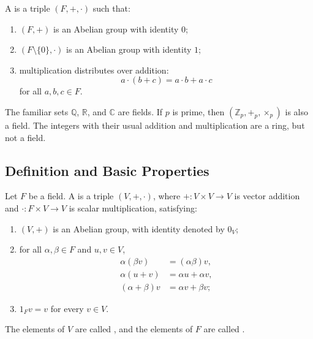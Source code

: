 \begin{Definition}
A  is a triple $(F,+,\cdot)$ such that:
\begin{enumerate}
\item $(F,+)$ is an Abelian group with identity $0$;
\item $(F\setminus\{0\},\cdot)$ is an Abelian group with identity $1$;
\item multiplication distributes over addition:
\begin{equation*}
a\cdot(b+c)=a\cdot b+a\cdot c
\end{equation*}
for all $a,b,c\in F$.
\end{enumerate}
\end{Definition}

The familiar sets $\mathbb Q$, $\mathbb R$, and $\mathbb C$ are fields. If $p$ is prime, then $(\mathbb Z_p,+_p,\times_p)$ is also a field. The integers with their usual addition and multiplication are a ring, but not a field.

\subsection{Definition and Basic Properties}

\begin{Definition}\label{def:VectorSpace}
Let $F$ be a field. A  is a triple $(V,+,\cdot)$, where $+\colon V\times V\to V$ is vector addition and $\cdot\colon F\times V\to V$ is scalar multiplication, satisfying:
\begin{enumerate}
\item $(V,+)$ is an Abelian group, with identity denoted by $0_V$;
\item for all $\alpha,\beta\in F$ and $u,v\in V$,
\begin{align*}
\alpha(\beta v)&=(\alpha\beta)v,\\
\alpha(u+v)&=\alpha u+\alpha v,\\
(\alpha+\beta)v&=\alpha v+\beta v;
\end{align*}
\item $1_Fv=v$ for every $v\in V$.
\end{enumerate}
The elements of $V$ are called , and the elements of $F$ are called .
\end{Definition}

